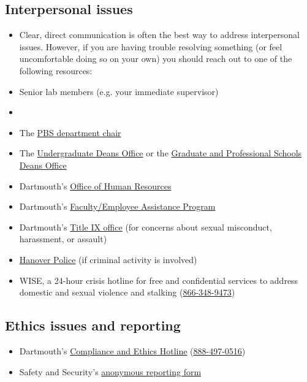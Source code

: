 \documentclass{tufte-book} %
\begin{document}
\subsection{Interpersonal issues}\label{sec:interpersonal}
\begin{itemize}
\item Clear, direct communication is often the best way to address interpersonal issues. However, if you are having trouble resolving something (or feel uncomfortable doing so on your own) you should reach out to one of the following resources:

\item Senior lab members (e.g. your immediate supervisor)

\item \director

\item The \href{https://pbs.dartmouth.edu/people}{PBS department chair}

\item The \href{https://students.dartmouth.edu/undergraduate-deans/}{Undergraduate Deans Office} or the \href{mailto:Graduate.and.Advanced.Studies@Dartmouth.edu}{Graduate and Professional Schools Deans Office}

\item Dartmouth's \href{https://www.dartmouth.edu/~hrs/}{Office of Human Resources}

\item Dartmouth's \href{https://www.dartmouth.edu/~eap/}{Faculty/Employee Assistance Program}

\item Dartmouth's \href{https://sexual-respect.dartmouth.edu/}{Title IX office} (for concerns about sexual misconduct, harassment, or assault)

\item \href{https://www.hanovernh.org/hanover-police-department}{Hanover Police} (if criminal activity is involved)

\item WISE, a 24-hour crisis hotline for free and confidential services to address domestic and sexual violence and stalking (\href{tel:18884970516}{866-348-9473})

\end{itemize}

\subsection{Ethics issues and reporting}
\begin{itemize}

\item Dartmouth's \href{https://www.dartmouth.ethicspoint.com}{Compliance and Ethics Hotline} (\href{tel:18884970516}{888-497-0516})
\item Safety and Security's \href{https://www.dartmouth.edu/~security/services/forms/anonreport.html}{anonymous reporting form}

\end{itemize}
\end{document}
